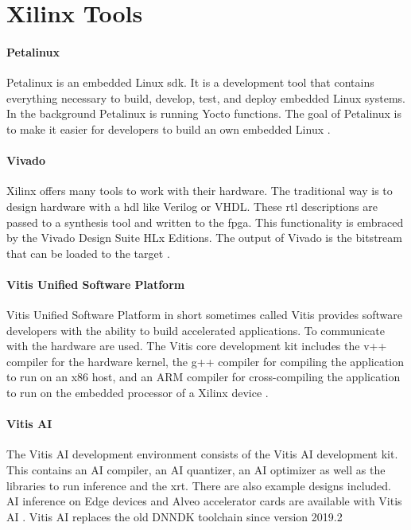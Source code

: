 \section{Xilinx Tools}
\label{sec:embedded_platform:xilinx_tools}

\paragraph{Petalinux}
Petalinux is an embedded Linux \acrfull{sdk}.
It is a development tool that contains everything necessary to build, develop, test, and deploy embedded Linux systems.
In the background Petalinux is running Yocto functions.
The goal of Petalinux is to make it easier for developers to build an own embedded Linux \cite{petalinux_user_guide}.

\paragraph{Vivado}
Xilinx offers many tools to work with their hardware.
The traditional way is to design hardware with a \acrfull{hdl} like Verilog or VHDL.
These \acrfull{rtl} descriptions are passed to a synthesis tool and written to the \acrshort{fpga}.
This functionality is embraced by the Vivado Design Suite HLx Editions.
The output of Vivado is the bitstream that can be loaded to the target \cite{vivado_user_guide}.

\paragraph{Vitis Unified Software Platform}
Vitis Unified Software Platform in short sometimes called Vitis provides software developers with the ability to build accelerated applications.
To communicate with the hardware  are used.
The Vitis core development kit includes the v++ compiler for the hardware kernel, the g++ compiler for compiling the application to run on an x86 host, and an ARM compiler for cross-compiling the application to run on the embedded processor of a Xilinx device \cite{vitis_user_guide}.

\paragraph{Vitis AI}
The Vitis AI development environment consists of the Vitis AI development kit.
This contains an AI compiler, an AI quantizer, an AI optimizer as well as the libraries to run inference and the \acrfull{xrt}.
There are also example designs included.
AI inference on Edge devices and Alveo accelerator cards are available with Vitis AI \cite{vitis_ai_user_guide}.
Vitis AI replaces the old DNNDK toolchain since version 2019.2 

